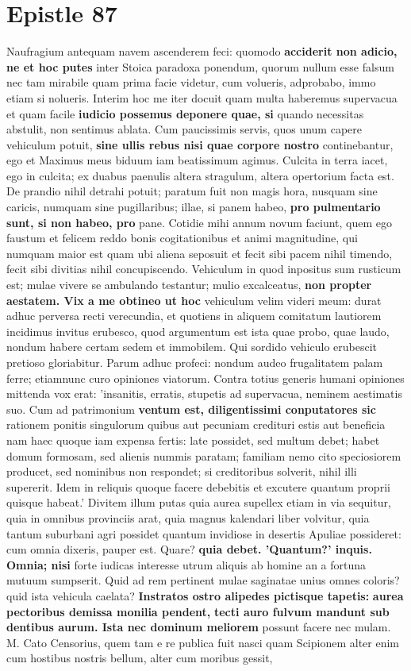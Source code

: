 \section{Epistle 87}
Naufragium antequam navem ascenderem feci: quomodo \textbf{acciderit non adicio, ne et hoc putes} inter Stoica paradoxa ponendum, quorum nullum esse falsum nec tam mirabile quam prima facie videtur, cum volueris, adprobabo, immo etiam si nolueris. Interim hoc me iter docuit quam multa haberemus supervacua et quam facile \textbf{iudicio possemus deponere quae, si} quando necessitas abstulit, non sentimus ablata. Cum paucissimis servis, quos unum capere vehiculum potuit, \textbf{sine ullis rebus nisi quae corpore nostro} continebantur, ego et Maximus meus biduum iam beatissimum agimus. Culcita in terra iacet, ego in culcita; ex duabus paenulis altera stragulum, altera opertorium facta est. De prandio nihil detrahi potuit; paratum fuit non magis hora, nusquam sine caricis, numquam sine pugillaribus; illae, si panem habeo, \textbf{pro pulmentario sunt, si non habeo, pro} pane. Cotidie mihi annum novum faciunt, quem ego faustum et felicem reddo bonis cogitationibus et animi magnitudine, qui numquam maior est quam ubi aliena seposuit et fecit sibi pacem nihil timendo, fecit sibi divitias nihil concupiscendo. Vehiculum in quod inpositus sum rusticum est; mulae vivere se ambulando testantur; mulio excalceatus, \textbf{non propter aestatem. Vix a me obtineo ut hoc} vehiculum velim videri meum: durat adhuc perversa recti verecundia, et quotiens in aliquem comitatum lautiorem incidimus invitus erubesco, quod argumentum est ista quae probo, quae laudo, nondum habere certam sedem et immobilem. Qui sordido vehiculo erubescit pretioso gloriabitur. Parum adhuc profeci: nondum audeo frugalitatem palam ferre; etiamnunc curo opiniones viatorum. Contra totius generis humani opiniones mittenda vox erat: 'insanitis, erratis, stupetis ad supervacua, neminem aestimatis suo. Cum ad patrimonium \textbf{ventum \textbf{est, diligentissimi conputatores} sic} rationem ponitis singulorum quibus aut pecuniam credituri estis aut beneficia nam haec quoque iam expensa fertis: late possidet, sed multum debet; habet domum formosam, sed alienis nummis paratam; familiam nemo cito speciosiorem producet, sed nominibus non respondet; si creditoribus solverit, nihil illi supererit. Idem in reliquis quoque facere debebitis et excutere quantum proprii quisque habeat.' Divitem illum putas quia aurea supellex etiam in via sequitur, quia in omnibus provinciis arat, quia magnus kalendari liber volvitur, quia tantum suburbani agri possidet quantum invidiose in desertis Apuliae possideret: cum omnia dixeris, pauper est. Quare? \textbf{quia debet. 'Quantum?' inquis. Omnia; nisi} forte iudicas interesse utrum aliquis ab homine an a fortuna mutuum sumpserit. Quid ad rem pertinent mulae saginatae unius omnes coloris? quid ista vehicula caelata? \textbf{Instratos ostro alipedes pictisque tapetis:} \textbf{aurea pectoribus demissa monilia pendent,} \textbf{tecti \textbf{auro fulvum mandunt sub \textbf{dentibus aurum.}} Ista nec dominum meliorem} possunt facere nec mulam. M. Cato Censorius, quem tam e re publica fuit nasci quam Scipionem alter enim cum hostibus nostris bellum, alter cum moribus gessit, 